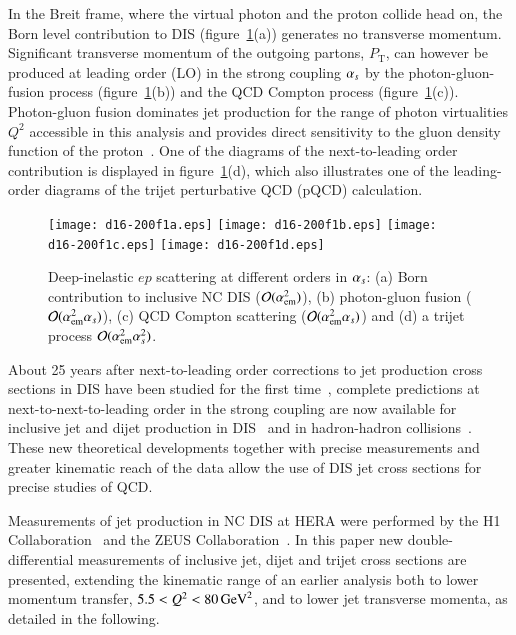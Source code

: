 \documentclass[12pt]{article}
\begin{document}
In the Breit frame, where the virtual photon and the proton collide head on, 
the Born level contribution to DIS (figure~\ref{fig:feynborn}(a)) generates no transverse momentum. 
Significant transverse momentum of the outgoing partons, $P_{\mathrm{T}}$, can however be produced 
at leading order (LO) in the strong coupling $\as$ by the 
photon-gluon-fusion process (figure~\ref{fig:feynborn}(b)) and the QCD Compton process (figure~\ref{fig:feynborn}(c)). 
Photon-gluon fusion dominates jet production for the range of photon virtualities $Q^2$ accessible in this analysis
 and provides direct sensitivity to the gluon density function of the proton~\cite{Adloff2001}.
One of the diagrams of the next-to-leading order contribution is displayed in figure~\ref{fig:feynborn}(d),
which also illustrates one of the leading-order diagrams of the trijet perturbative QCD (pQCD) calculation.
\begin{figure}[h]
\centering
 \texttt{[image: d16-200f1a.eps]}\hskip0.5cm
 \texttt{[image: d16-200f1b.eps]}\hskip0.5cm
 \texttt{[image: d16-200f1c.eps]}\hskip0.5cm
 \texttt{[image: d16-200f1d.eps]}\hskip0.5cm 
\caption[Diagrams of different order in $\as$ in deep-inelastic lepton-proton scattering] %
{ Deep-inelastic $ep$ scattering at different orders in $\as$: 
  (a) Born contribution to inclusive NC DIS ($\mathcal{O}(\aem^2)$), 
  (b) photon-gluon fusion ($\mathcal{O}(\aem^2 \as)$),
  (c) QCD Compton scattering ($\mathcal{O}(\aem^2 \as)$) and 
  (d) a trijet process $\mathcal{O}(\aem^2 \as^2)$.
}
\label{fig:feynborn}
\end{figure}

About 25 years after next-to-leading order corrections to
 jet production cross sections in DIS have been studied for the first time~\cite{GraudenzThesis,Graudenz},
complete predictions at next-to-next-to-leading order in the strong coupling are now available for inclusive jet and dijet production in DIS~\cite{NNLO,NNLO17} and in hadron-hadron collisions~\cite{Currie:2016bfm}.
These new theoretical developments together with precise measurements and greater kinematic reach of the
 data allow the use of DIS jet cross sections for precise studies of QCD.


Measurements of jet production in NC DIS at HERA were performed by the H1 Collaboration~\cite{Adloff2001,H1_jets0,H1_jets1,H1_jets2,H1_jets3,H1_jets4,H1_jets9597,Adloff:2002ew,Aktas:2003ja,Aktas:2004px,H1_highq2,H1_lowq2,H1_highq2_H1andH2,H1Multijets} and
 the ZEUS Collaboration~\cite{ZEUS_jets0,ZEUS_jets1,Chekanov:2002be,ZEUS_jets2,ZEUS_jets3,Chekanov:2006xr,ZEUS_jets4,ZEUS_IJ_2010,ZEUS_2J_2010}.
In this paper new double-differential measurements of inclusive jet, 
dijet and trijet cross sections are presented,
extending the kinematic range of an earlier
 analysis \cite{H1Multijets} both to lower momentum transfer, $5.5<Q^2<80\,\GeVsq$, and to lower jet transverse momenta, as detailed in the following.
\end{document}
